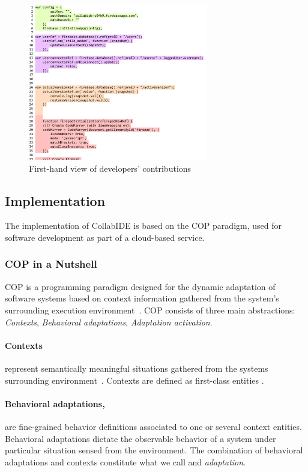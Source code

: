 \begin{figure}[htbp]
  \centering
  \includegraphics[width=0.7\textwidth]{img/fig2-collabIDEConcurrentProgramming}
  \caption{First-hand view of developers' contributions}
  \label{fig:layers}
\end{figure}


\subsection{Implementation}
\label{sec:implementation}

The implementation of CollabIDE is based on the \acf{COP} paradigm, used for software development 
as part of a cloud-based service.

\subsubsection{\ac{COP} in a Nutshell}
\ac{COP} is a programming paradigm designed for the dynamic adaptation of software systems based on context information gathered from the system's surrounding execution environment~\cite{salvaneschi+12survey}. \ac{COP} consists of three main abstractions: \emph{Contexts}, \emph{Behavioral adaptations}, \emph{Adaptation activation}.

\paragraph{Contexts} represent semantically meaningful situations gathered from the systems surrounding environment~\cite{dey01}. Contexts are defined as first-class entities .

\paragraph{Behavioral adaptations,} are fine-grained behavior definitions associated to one or several context entities. Behavioral adaptations dictate the observable behavior of a system under particular situation sensed from the environment. The combination of behavioral adaptations and contexts constitute what we call and \emph{adaptation}.

